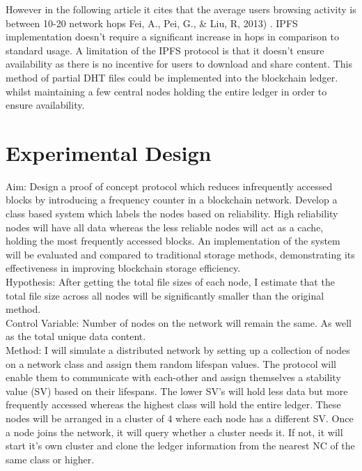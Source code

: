 \documentclass{article}
\begin{document}
\begin{CJK}{UTF8}{gbsn}
However in the following article it cites that the average users browsing activity is between 10-20 network hops Fei, A., Pei, G., \& Liu, R,  2013) . IPFS implementation doesn’t require a significant increase in hops in comparison to standard usage. A limitation of the IPFS protocol is that it doesn’t ensure availability as there is no incentive for users to download and share content. This method of partial DHT files could be implemented into the blockchain ledger. whilst maintaining a few central nodes holding the entire ledger in order  to ensure availability.

\section{Experimental Design}

Aim: Design a proof of concept protocol which reduces infrequently accessed blocks by introducing a frequency counter in a blockchain network. Develop a class based system which labels the nodes based on reliability. High reliability nodes will have all data whereas the less reliable nodes will act as a cache, holding the most frequently accessed blocks. An implementation of the system will be evaluated and compared to traditional storage methods, demonstrating its effectiveness in improving blockchain storage efficiency.\\

Hypothesis: After getting the total file sizes of each node, I estimate that the total file size across all nodes will be significantly smaller than the original method. \\

Control Variable: Number of nodes on the network will remain the same. As well as the total unique data content.\\

Method: I will simulate a distributed network by setting up a collection of nodes on a network class and assign them random lifespan values. The protocol will enable them to communicate with each-other and assign themselves a stability value (SV) based on their lifespans. The lower SV’s will hold less data but more frequently accessed whereas the highest class will hold the entire ledger. These nodes will be arranged in a cluster of 4 where each node has a different SV. Once a node joins the network, it will query whether a cluster needs it. If not, it will start it’s own cluster and clone the ledger information from the nearest NC of the same class or higher.\\


\end{CJK}
\end{document}
